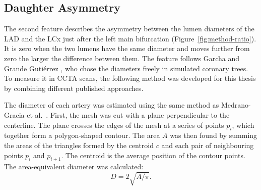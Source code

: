 \subsection{Daughter Asymmetry}
\label{sec:method-ratio}

The second feature describes the asymmetry between the lumen diameters of the LAD and the LCx just after the left main bifurcation (Figure~\ref{fig:method-ratio}). It is zero when the two lumens have the same diameter and moves further from zero the larger the difference between them. The feature follows Garcha and Grande Guti\'errez \cite{garcha2025sensitivity}, who chose the diameters freely in simulated coronary trees. To measure it in CCTA scans, the following method was developed for this thesis by combining different published approaches.

The diameter of each artery was estimated using the same method as Medrano-Gracia et al.\ \cite{medranogracia2016atlas}.
First, the mesh was cut with a plane perpendicular to the centerline. The plane crosses the edges of the mesh at a series of points $p_i$, which together form a polygon-shaped contour.
The area $A$ was then found by summing the areas of the triangles formed by the centroid $c$ and each pair of neighbouring points $p_i$ and $p_{i+1}$. The centroid is the average position of the contour points.
The area-equivalent diameter was calculated:
\begin{equation}
  D = 2 \sqrt{A / \pi} .
  \label{eq:method-diameter}
\end{equation}

